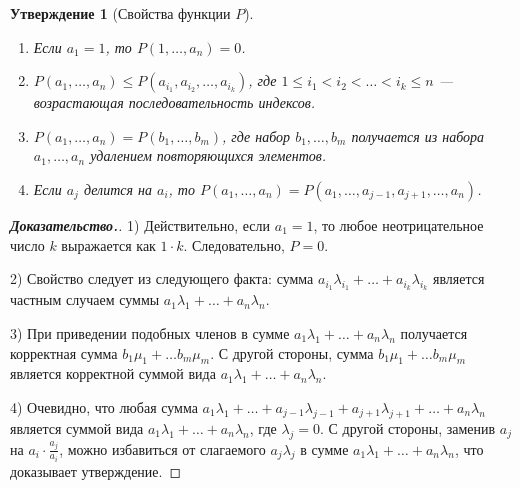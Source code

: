 \documentclass[12pt]{article}
\newtheorem{proposition}[theorem]{Утверждение}
\begin{document}
\begin{proposition}[Свойства функции $P$]{\ }
\label{propertiesOfP}
\begin{enumerate}
    \item Если $a_1 = 1$, то $P(1, \dots, a_n) = 0$.
    \item $P(a_1, \dots, a_n) \le P(a_{i_1} , a_{i_2}, \dots, a_{i_k})$, где $1 \le i_1 < i_2 < \dots < i_k \le n$ --- возрастающая последовательность индексов.
    \item $P(a_1, \dots, a_n) = P(b_1, \dots, b_m)$, где набор $b_1, \dots, b_m$ получается из набора $a_1, \dots, a_n$ удалением повторяющихся элементов.
    \item Если $a_j$ делится на $a_i$, то $P(a_1, \dots, a_n) = P(a_1, \dots, a_{j - 1}, a_{j + 1}, \dots, a_n)$.
\end{enumerate}
\end{proposition}
\begin{proof}[\textbf{Доказательство.}]
1) Действительно, если $a_1 = 1$, то любое неотрицательное число $k$ выражается как $1 \cdot k$. Следовательно, $P = 0$.

2) Свойство следует из следующего факта: сумма $a_{i_1} \lambda_{i_1} + \dots + a_{i_k}\lambda_{i_k}$ является частным случаем суммы $a_1 \lambda_1 + \dots + a_n \lambda_n$.

3) При приведении подобных членов в сумме $a_1 \lambda_1 + \dots + a_n \lambda_n$ получается корректная сумма $b_1 \mu_1 + \dots b_m \mu_m$. С другой стороны, сумма $b_1 \mu_1 + \dots b_m \mu_m$ является корректной суммой вида $a_1 \lambda_1 + \dots + a_n \lambda_n$.

4) Очевидно, что любая сумма $a_1 \lambda_1 + \dots + a_{j - 1} \lambda_{j - 1} + a_{j + 1} \lambda_{j + 1} + \dots +a_n \lambda_n$ является суммой вида $a_1 \lambda_1 + \dots + a_n \lambda_n$, где $\lambda_j = 0$. С другой стороны, заменив $a_j$ на $a_i \cdot \frac{a_j}{a_i}$, можно избавиться от слагаемого $a_j \lambda_j$ в сумме $a_1 \lambda_1 + \dots + a_n \lambda_n$, что доказывает утверждение.
\end{proof}
\end{document}
